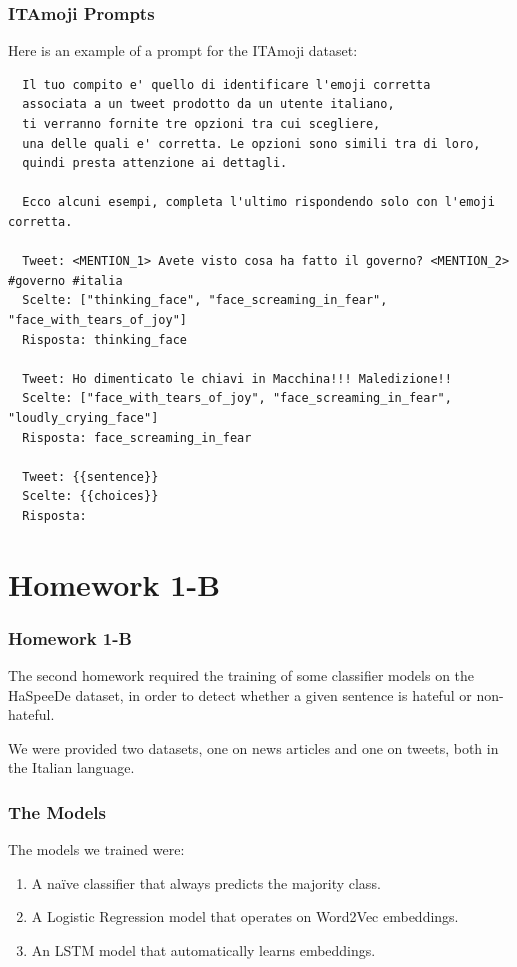 \documentclass[english, xcolor={table,usenames}]{beamer}
\begin{document}
\begin{frame}[fragile]
  \frametitle{ITAmoji Prompts}

  Here is an example of a prompt for the ITAmoji dataset:

  \tiny\begin{verbatim}
  Il tuo compito e' quello di identificare l'emoji corretta 
  associata a un tweet prodotto da un utente italiano, 
  ti verranno fornite tre opzioni tra cui scegliere, 
  una delle quali e' corretta. Le opzioni sono simili tra di loro, 
  quindi presta attenzione ai dettagli.

  Ecco alcuni esempi, completa l'ultimo rispondendo solo con l'emoji corretta.

  Tweet: <MENTION_1> Avete visto cosa ha fatto il governo? <MENTION_2> #governo #italia
  Scelte: ["thinking_face", "face_screaming_in_fear", "face_with_tears_of_joy"]
  Risposta: thinking_face

  Tweet: Ho dimenticato le chiavi in Macchina!!! Maledizione!!
  Scelte: ["face_with_tears_of_joy", "face_screaming_in_fear", "loudly_crying_face"]
  Risposta: face_screaming_in_fear

  Tweet: {{sentence}}
  Scelte: {{choices}}
  Risposta:
\end{verbatim}

\end{frame}

\section{Homework 1-B}

\begin{frame}
  \frametitle{Homework 1-B}

  The second homework required the training of some classifier models on the HaSpeeDe dataset,
  in order to detect whether a given sentence is \alert{hateful} or \alert{non-hateful}.

  We were provided \alert{two} datasets, one on news articles and one on tweets, both in
  the Italian language.
\end{frame}

\begin{frame}
  \frametitle{The Models}

  The models we trained were:

  \begin{enumerate}
    \item<1-> A naïve classifier that always predicts the majority class.
    \item<2-> A Logistic Regression model that operates on Word2Vec embeddings.
    \item<3-> An LSTM model that automatically learns embeddings.
  \end{enumerate}

\end{frame}
\end{document}
